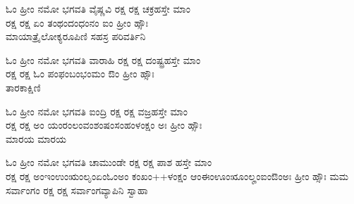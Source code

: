 ಓಂ ಹ್ರೀಂ ನಮೋ ಭಗವತಿ ವೈಷ್ಣವಿ ರಕ್ಷ ರಕ್ಷ ಚಕ್ರಹಸ್ತೇ ಮಾಂ\\ ರಕ್ಷ ರಕ್ಷ ಏಂ ತಂಥಂದಂಧಂನಂ ಐಂ ಹ್ರೀಂ ಹ್ಸೌಃ\\ ಮಾಯಾತ್ರೈಲೋಕ್ಯರೂಪಿಣಿ ಸಹಸ್ರ ಪರಿವರ್ತಿನಿ 

ಓಂ ಹ್ರೀಂ ನಮೋ ಭಗವತಿ ವಾರಾಹಿ ರಕ್ಷ ರಕ್ಷ ದಂಷ್ಟ್ರಹಸ್ತೇ ಮಾಂ\\ ರಕ್ಷ ರಕ್ಷ ಓಂ ಪಂಫಂಬಂಭಂಮಂ ಔಂ ಹ್ರೀಂ ಹ್ಸೌಃ\\ ತಾರಕಾಕ್ಷಿಣಿ 

ಓಂ ಹ್ರೀಂ ನಮೋ ಭಗವತಿ ಐಂದ್ರಿ ರಕ್ಷ ರಕ್ಷ ವಜ್ರಹಸ್ತೇ ಮಾಂ\\ ರಕ್ಷ ರಕ್ಷ ಅಂ ಯಂರಂಲಂವಂಶಂಷಂಸಂಹಂಳಂಕ್ಷಂ ಅಃ  ಹ್ರೀಂ ಹ್ಸೌಃ \\ಮಾರಯ ಮಾರಯ 

ಓಂ ಹ್ರೀಂ ನಮೋ ಭಗವತಿ ಚಾಮುಂಡೇ ರಕ್ಷ ರಕ್ಷ ಪಾಶ ಹಸ್ತೇ ಮಾಂ\\ ರಕ್ಷ ರಕ್ಷ  ಅಂಇಂಉಂಋಂಲೃಂಏಂಓಂಅಂ ಕಂಖಂ++ಳಂಕ್ಷಂ ಆಂಈಂಊಂೠಂಲೄಂಐಂಔಂಅಃ  ಹ್ರೀಂ ಹ್ಸೌಃ ಮಮ ಸರ್ವಾಂಗಂ ರಕ್ಷ ರಕ್ಷ ಸರ್ವಾಂಗವ್ಯಾಪಿನಿ ಸ್ವಾಹಾ 


